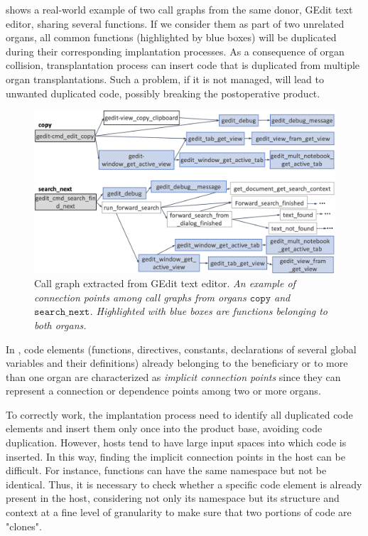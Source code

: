 shows a real-world example of two call graphs from the same donor, GEdit text editor, sharing several functions. If we consider them as part of two unrelated organs, all common functions (highlighted by blue boxes) will be duplicated during their corresponding implantation processes. As a consequence of organ collision, transplantation process can insert code that is duplicated from multiple organ transplantations. Such a problem, if it is not managed, will lead to unwanted duplicated code, possibly breaking the postoperative product. 

\begin{figure}[t]
	\centering \includegraphics[width=\linewidth]{images/organs_dependency3.png}	\caption{Call graph extracted from GEdit text editor. \textit{An example of connection points among call graphs from organs $\texttt{copy}$ and $\texttt{search\_next}$. Highlighted with blue boxes are functions belonging to both organs.}}
	\label{fig:organs_connection_point}
\end{figure} 

In \FOUNDRY, code elements (functions, directives, constants, declarations of several global variables and their definitions) already belonging to the beneficiary or to more than one organ are characterized as \emph{implicit connection points} since they can represent a connection or dependence points among two or more organs. 

To correctly work, the implantation process need to identify all duplicated code elements and insert them only once into the product base, avoiding code duplication. However, hosts tend to have large input spaces into which code is inserted. In this way, finding the implicit connection points in the host can be difficult. For instance, functions can have the same namespace but not be identical. Thus, it is necessary to check whether a specific code element is already present in the host, considering not only its namespace but its structure and context at a fine level of granularity to make sure that two portions of code are "clones".

